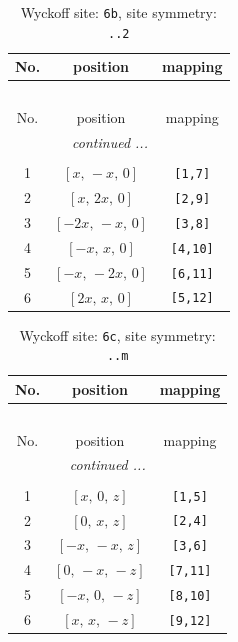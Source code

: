 \documentclass[fleqn,8pt]{jsarticle}
\begin{document}
\begin{longtable}{ccc}
\caption{Wyckoff site: {\tt 6b}, site symmetry: {\tt ..2}}
 \\
 \hline \hline
No. & position & mapping \\ \hline \endfirsthead

\multicolumn{2}{l}{\tablename\ \thetable{}} \\
 \hline \hline
No. & position & mapping \\ \hline \endhead

 \hline \hline
\multicolumn{2}{r}{\footnotesize\it continued ...} \\ \endfoot

 \hline \hline
\multicolumn{2}{r}{} \\ \endlastfoot

1 & $\left[ x,\, - x,\, 0 \right]$ & {\tt [1,7]} \\ \hline
2 & $\left[ x,\, 2 x,\, 0 \right]$ & {\tt [2,9]} \\ \hline
3 & $\left[ - 2 x,\, - x,\, 0 \right]$ & {\tt [3,8]} \\ \hline
4 & $\left[ - x,\, x,\, 0 \right]$ & {\tt [4,10]} \\ \hline
5 & $\left[ - x,\, - 2 x,\, 0 \right]$ & {\tt [6,11]} \\ \hline
6 & $\left[ 2 x,\, x,\, 0 \right]$ & {\tt [5,12]} \\
\end{longtable}
\renewcommand{\arraystretch}{1.2}
\begin{longtable}{ccc}
\caption{Wyckoff site: {\tt 6c}, site symmetry: {\tt ..m}}
 \\
 \hline \hline
No. & position & mapping \\ \hline \endfirsthead

\multicolumn{2}{l}{\tablename\ \thetable{}} \\
 \hline \hline
No. & position & mapping \\ \hline \endhead

 \hline \hline
\multicolumn{2}{r}{\footnotesize\it continued ...} \\ \endfoot

 \hline \hline
\multicolumn{2}{r}{} \\ \endlastfoot

1 & $\left[ x,\, 0,\, z \right]$ & {\tt [1,5]} \\ \hline
2 & $\left[ 0,\, x,\, z \right]$ & {\tt [2,4]} \\ \hline
3 & $\left[ - x,\, - x,\, z \right]$ & {\tt [3,6]} \\ \hline
4 & $\left[ 0,\, - x,\, - z \right]$ & {\tt [7,11]} \\ \hline
5 & $\left[ - x,\, 0,\, - z \right]$ & {\tt [8,10]} \\ \hline
6 & $\left[ x,\, x,\, - z \right]$ & {\tt [9,12]} \\
\end{longtable}
\end{document}
